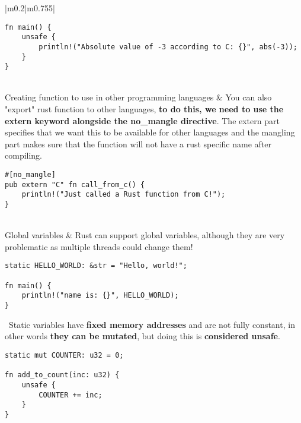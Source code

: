 \documentclass[main.tex,fontsize=8pt,paper=a4,paper=portrait,DIV=calc,]{scrartcl}
\begin{document}
\begin{table}[ht!]
\begin{tabular}{|m{0.2\linewidth}|m{0.755\linewidth}|}
\begin{lstlisting}
fn main() {
    unsafe {
        println!("Absolute value of -3 according to C: {}", abs(-3));
    }
}
\end{lstlisting}\\
\hline
Creating function to use in other programming languages & 
You can also "export" rust function to other languages, \textbf{to do this, we need to use the extern keyword alongside the no\_mangle directive}.\newline
The extern part specifies that we want this to be available for other languages and the mangling part makes sure that the function will not have a rust specific name after compiling.\newline
\begin{lstlisting}
#[no_mangle]
pub extern "C" fn call_from_c() {
    println!("Just called a Rust function from C!");
}
\end{lstlisting}\\
\hline
Global variables & 
Rust can support global variables, although they are very problematic as multiple threads could change them! \newline
\begin{lstlisting}
static HELLO_WORLD: &str = "Hello, world!";

fn main() {
    println!("name is: {}", HELLO_WORLD);
}
\end{lstlisting} 
\, \newline
\textcolor{OliveGreen}{Static variables have \textbf{fixed memory addresses} and are not fully constant, in other words \textbf{they can be mutated}, but doing this is \textbf{considered unsafe}.}\newline
\begin{lstlisting}
static mut COUNTER: u32 = 0;

fn add_to_count(inc: u32) {
    unsafe {
        COUNTER += inc;
    }
}
\end{lstlisting}\\
\hline
\end{tabular}
\end{table}
\pagebreak
\end{document}
